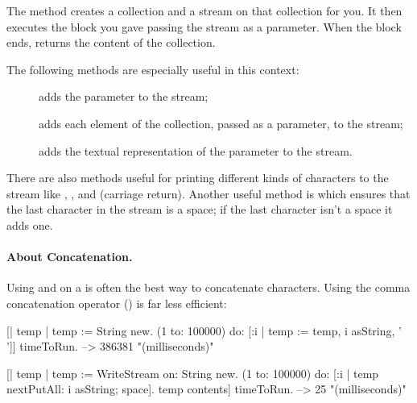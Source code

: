 \documentclass[a4paper,10pt,twoside]{book}
\begin{document}

The method  \label{sec:streamContents} creates a collection and a stream on
that collection for you.
It then executes the block you gave passing the stream as a parameter.
When the block ends,  returns the content of the collection.

The following  methods are especially useful in this context:

\begin{description}
\item[] adds the parameter to the stream;
\item[] adds each element of the collection, passed as a
  parameter, to the stream;
\item[] adds the textual representation of the parameter to the
  stream.
\end{description}

There are also methods useful for printing different kinds of characters to the stream like , , and  (carriage return).
Another useful method is  which ensures that the last character in the stream is a space; if the last character isn't a space it adds one.

\paragraph{About Concatenation.}
Using  and  on a  is often the best way to concatenate characters.
Using the comma concatenation operator (\ct{,}) is far less efficient:

\begin{code}{}
[| temp |
  temp := String new.
  (1 to: 100000) do: [:i | 
    temp := temp, i asString, ' ']] timeToRun. --> 386381 "(milliseconds)"

[| temp |
  temp := WriteStream on: String new.
  (1 to: 100000) do: [:i | 
    temp nextPutAll: i asString; space].
  temp contents] timeToRun. --> 25 "(milliseconds)"
\end{code}
\end{document}
